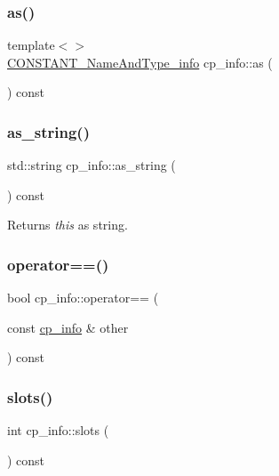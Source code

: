 \subsubsection{\texorpdfstring{as()}{as()}\hspace{0.1cm}{\footnotesize\ttfamily [4/4]}}
{\footnotesize\ttfamily template$<$$>$ \\
\hyperlink{structCONSTANT__NameAndType__info}{C\+O\+N\+S\+T\+A\+N\+T\+\_\+\+Name\+And\+Type\+\_\+info} cp\+\_\+info\+::as (\begin{DoxyParamCaption}{ }\end{DoxyParamCaption}) const}

\mbox{\label{structcp__info_a8bdd7454a673dea621f24569c4c6aa01}} 
\subsubsection{\texorpdfstring{as\+\_\+string()}{as\_string()}}
{\footnotesize\ttfamily std\+::string cp\+\_\+info\+::as\+\_\+string (\begin{DoxyParamCaption}{ }\end{DoxyParamCaption}) const}



Returns {\itshape this} as string. 

\mbox{\label{structcp__info_a486b4be323e8194d6efcf388f3533fb1}} 
\subsubsection{\texorpdfstring{operator==()}{operator==()}}
{\footnotesize\ttfamily bool cp\+\_\+info\+::operator== (\begin{DoxyParamCaption}\item[{const \hyperlink{structcp__info}{cp\+\_\+info} \&}]{other }\end{DoxyParamCaption}) const}

\mbox{\label{structcp__info_a1371b901a960486462d8cc6efc0c6ee8}} 
\subsubsection{\texorpdfstring{slots()}{slots()}}
{\footnotesize\ttfamily int cp\+\_\+info\+::slots (\begin{DoxyParamCaption}{ }\end{DoxyParamCaption}) const}



